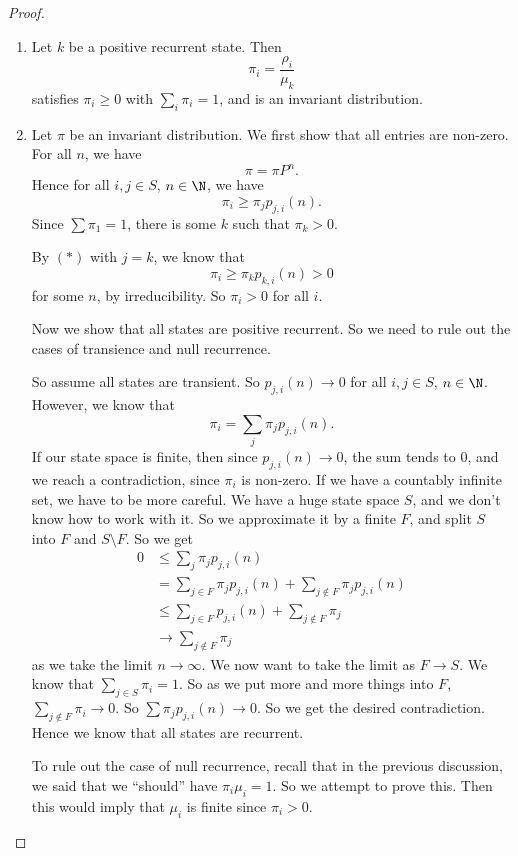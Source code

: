 \documentclass[a4paper]{article}
\begin{document}
\begin{proof}\leavevmode
  \begin{enumerate}
    \item Let $k$ be a positive recurrent state. Then
      \[
        \pi_i = \frac{\rho_i}{\mu_k}
      \]
      satisfies $\pi_i \geq 0$ with $\sum_i \pi_i = 1$, and is an invariant distribution.
    \item Let $\pi$ be an invariant distribution. We first show that all entries are non-zero. For all $n$, we have
      \[
        \pi = \pi P^n.
      \]
      Hence for all $i, j \in S$, $n \in \N$, we have
      \[
        \pi_i \geq \pi_j p_{j,i}(n).\tag{$*$}
      \]
      Since $\sum \pi_1 = 1$, there is some $k$ such that $\pi_k > 0$.

      By $(*)$ with $j = k$, we know that
      \[
        \pi_i \geq \pi_k p_{k,i}(n) > 0
      \]
      for some $n$, by irreducibility. So $\pi_i > 0$ for all $i$.

      Now we show that all states are positive recurrent. So we need to rule out the cases of transience and null recurrence.

      So assume all states are transient. So $p_{j, i}(n) \to 0$ for all $i, j\in S$, $n \in \N$. However, we know that
      \[
        \pi_i = \sum_j \pi_j p_{j, i}(n).
      \]
      If our state space is finite, then since $p_{j, i}(n) \to 0$, the sum tends to $0$, and we reach a contradiction, since $\pi_i$ is non-zero. If we have a countably infinite set, we have to be more careful. We have a huge state space $S$, and we don't know how to work with it. So we approximate it by a finite $F$, and split $S$ into $F$ and $S\setminus F$. So we get
      \begin{align*}
        0 &\leq \sum_j \pi_j p_{j, i}(n)\\
        &= \sum_{j \in F} \pi_j p_{j, i}(n) + \sum_{j \not\in F} \pi_j p_{j, i}(n) \\
        &\leq \sum_{j \in F}p_{j, i}(n) + \sum_{j \not\in F}\pi_j\\
        &\to \sum_{j \not\in F}\pi_j
      \end{align*}
      as we take the limit $n \to \infty$. We now want to take the limit as $F \to S$. We know that $\sum_{j \in S} \pi_i = 1$. So as we put more and more things into $F$, $\sum_{j \not\in F} \pi_i \to 0$. So $\sum \pi_j p_{j, i}(n) \to 0$. So we get the desired contradiction. Hence we know that all states are recurrent.

      To rule out the case of null recurrence, recall that in the previous discussion, we said that we ``should'' have $\pi_i \mu_i =1 $. So we attempt to prove this. Then this would imply that $\mu_i$ is finite since $\pi_i > 0$.


\end{enumerate}
\end{proof}
\end{document}
